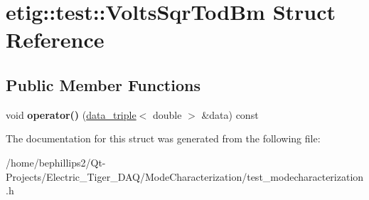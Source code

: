 \hypertarget{structetig_1_1test_1_1_volts_sqr_tod_bm}{}\section{etig\+:\+:test\+:\+:Volts\+Sqr\+Tod\+Bm Struct Reference}
\label{structetig_1_1test_1_1_volts_sqr_tod_bm}
\subsection*{Public Member Functions}
\begin{DoxyCompactItemize}
\item 
void {\bfseries operator()} (\hyperlink{structdata__triple}{data\+\_\+triple}$<$ double $>$ \&data) const \hypertarget{structetig_1_1test_1_1_volts_sqr_tod_bm_acee890024218eb2188f7cdbd2a44b29b}{}\label{structetig_1_1test_1_1_volts_sqr_tod_bm_acee890024218eb2188f7cdbd2a44b29b}

\end{DoxyCompactItemize}


The documentation for this struct was generated from the following file\+:\begin{DoxyCompactItemize}
\item 
/home/bephillips2/\+Qt-\/\+Projects/\+Electric\+\_\+\+Tiger\+\_\+\+D\+A\+Q/\+Mode\+Characterization/test\+\_\+modecharacterization.\+h\end{DoxyCompactItemize}
